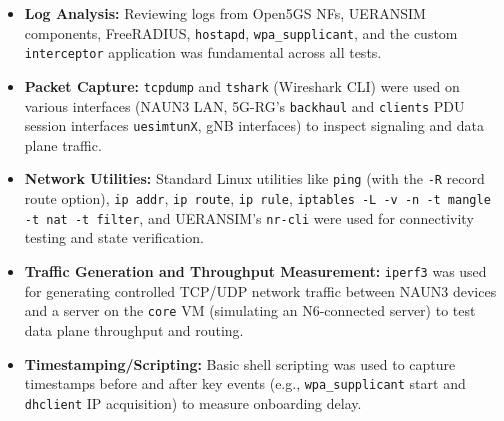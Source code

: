 \begin{itemize}
    \item \textbf{Log Analysis:} Reviewing logs from Open5GS \acp{NF}, UERANSIM components, FreeRADIUS, \texttt{hostapd}, \texttt{wpa\_supplicant}, and the custom \texttt{interceptor} application was fundamental across all tests.

    \item \textbf{Packet Capture:} \texttt{tcpdump} and \texttt{tshark} (Wireshark \ac{CLI}) were used on various interfaces (\ac{NAUN3} \ac{LAN}, \ac{5G-RG}'s \texttt{backhaul} and \texttt{clients} \ac{PDU} session interfaces \texttt{uesimtunX}, \ac{gNB} interfaces) to inspect signaling and data plane traffic.

    \item \textbf{Network Utilities:} Standard Linux utilities like \texttt{ping} (with the \texttt{-R} record route option), \texttt{ip addr}, \texttt{ip route}, \texttt{ip rule}, \texttt{iptables -L -v -n -t mangle -t nat -t filter}, and UERANSIM's \texttt{nr-cli} were used for connectivity testing and state verification.

    \item \textbf{Traffic Generation and Throughput Measurement:} \texttt{iperf3} was used for generating controlled \ac{TCP}/\ac{UDP} network traffic between \ac{NAUN3} devices and a server on the \texttt{core} \ac{VM} (simulating an N6-connected server) to test data plane throughput and routing.

    \item \textbf{Timestamping/Scripting:} Basic shell scripting was used to capture timestamps before and after key events (e.g., \texttt{wpa\_supplicant} start and \texttt{dhclient} \ac{IP} acquisition) to measure onboarding delay.
\end{itemize}

